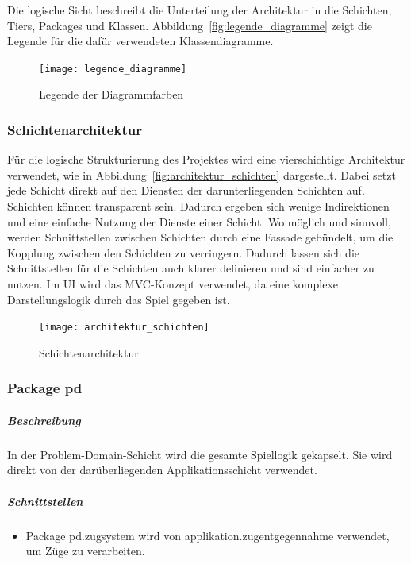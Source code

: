 \documentclass[12pt,halfparskip]{scrartcl}
\begin{document}
Die logische Sicht beschreibt die Unterteilung der Architektur in die Schichten, Tiers, Packages und Klassen. Abbildung~\vref{fig:legende_diagramme} zeigt die Legende für die dafür verwendeten Klassendiagramme.

\begin{figure}[h]
	\centering
	\texttt{[image: legende\_diagramme]}
	\caption{Legende der Diagrammfarben}
	\label{fig:legende_diagramme}
\end{figure}

\subsubsection{Schichtenarchitektur} %
\label{sub:schichtenarchitektur}
Für die logische Strukturierung des Projektes wird eine vierschichtige Architektur verwendet, wie in Abbildung~\vref{fig:architektur_schichten} dargestellt. Dabei setzt jede Schicht direkt auf den Diensten der darunterliegenden Schichten auf. Schichten können transparent sein. Dadurch ergeben sich wenige Indirektionen und eine einfache Nutzung der Dienste einer Schicht. Wo möglich und sinnvoll, werden Schnittstellen zwischen Schichten durch eine Fassade gebündelt, um die Kopplung zwischen den Schichten zu verringern. Dadurch lassen sich die Schnittstellen für die Schichten auch klarer definieren und sind einfacher zu nutzen. Im UI wird das MVC-Konzept verwendet, da eine komplexe Darstellungslogik durch das Spiel gegeben ist.
\begin{figure}
	\centering
	\texttt{[image: architektur\_schichten]}
	\caption{Schichtenarchitektur}
	\label{fig:architektur_schichten}
\end{figure}

\clearpage

\subsubsection{Package pd} %
\label{ssub:package_pd}
\subparagraph{Beschreibung}
In der Problem-Domain-Schicht wird die gesamte Spiellogik gekapselt. Sie wird direkt von der darüberliegenden Applikationsschicht verwendet.

\subparagraph{Schnittstellen} %
\label{ssub:schnittstellen}
\begin{itemize}
	\item Package pd.zugsystem wird von applikation.zugentgegennahme verwendet, um Züge zu verarbeiten.
\end{itemize}
\end{document}
